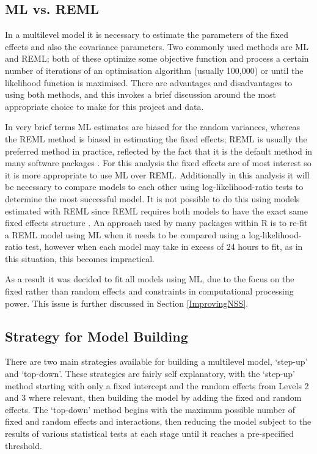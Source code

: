 \documentclass[11pt,a4paper]{report}
\begin{document}
\subsection{ML vs. REML} \label{REMLvsML}
In a multilevel model it is necessary to estimate the parameters of the fixed effects and also the covariance parameters. Two commonly used methods are \ac{ML} and \ac{REML}; both of these optimize some objective function and process a certain number of iterations of an optimisation algorithm (usually 100,000) or until the likelihood function is maximised. There are advantages and disadvantages to using both methods, and this invokes a brief discussion around the most appropriate choice to make for this project and data. 

In very brief terms ML estimates are biased for the random variances, whereas the REML method is biased in estimating the fixed effects; REML is usually the preferred method in practice, reflected by the fact that it is the default method in many software packages \cite{AppliedMLAnalysis}. For this analysis the fixed effects are of most interest so it is more appropriate to use ML over REML. Additionally in this analysis it will be necessary to compare models to each other using log-likelihood-ratio tests to determine the most successful model. It is not possible to do this using models estimated with REML since REML requires both models to have the exact same fixed effects structure \cite{LinearMMs}. An approach used by many packages within R is to re-fit a REML model using ML when it needs to be compared using a log-likelihood-ratio test, however when each model may take in excess of 24 hours to fit, as in this situation, this becomes impractical. 

As a result it was decided to fit all models using ML, due to the focus on the fixed rather than random effects and constraints in computational processing power. This issue is further discussed in Section \ref{ImprovingNSS}.


\subsection{Strategy for Model Building} 
There are two main strategies available for building a multilevel model, `step-up' and `top-down'. These strategies are fairly self explanatory, with the `step-up' method starting with only a fixed intercept and the random effects from Levels 2 and 3 where relevant, then building the model by adding the fixed and random effects. The `top-down' method begins with the maximum possible number of fixed and random effects and interactions, then reducing the model subject to the results of various statistical tests at each stage until it reaches a pre-specified threshold.
\end{document}
